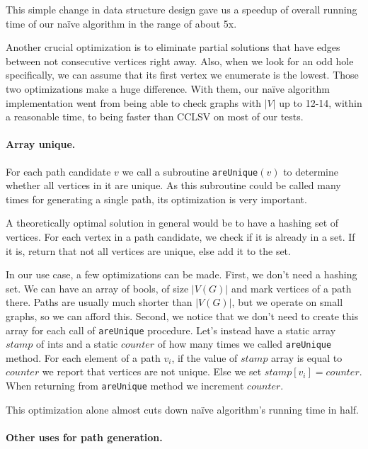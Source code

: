 This simple change in data structure design gave us a speedup of overall running time of our na\"ive algorithm in the range of about 5x.

Another crucial optimization is to eliminate partial solutions that have edges between not consecutive vertices right away. Also, when we look for an odd hole specifically, we can assume that its first vertex we enumerate is the lowest. Those two optimizations make a huge difference. With them, our na\"ive algorithm implementation went from being able to check graphs with $|V|$ up to 12-14, within a reasonable time, to being faster than CCLSV on most of our tests.

\paragraph{Array unique.}

For each path candidate $v$ we call a subroutine \texttt{areUnique}$(v)$ to determine whether all vertices in it are unique. As this subroutine could be called many times for generating a single path, its optimization is very important.

A theoretically optimal solution in general would be to have a hashing set of vertices. For each vertex in a path candidate, we check if it is already in a set. If it is, return that not all vertices are unique, else add it to the set.

In our use case, a few optimizations can be made. First, we don't need a hashing set. We can have an array of bools, of size $|V(G)|$ and mark vertices of a path there. Paths are usually much shorter than $|V(G)|$, but we operate on small graphs, so we can afford this. Second, we notice that we don't need to create this array for each call of \texttt{areUnique} procedure. Let's instead have a static array $stamp$ of ints and a static $counter$ of how many times we called \texttt{areUnique} method. For each element of a path $v_i$, if the value of $stamp$ array is equal to $counter$ we report that vertices are not unique. Else we set $stamp[v_i] = counter$. When returning from \texttt{areUnique} method we increment $counter$.

This optimization alone almost cuts down na\"ive algorithm's running time in half.

\paragraph{Other uses for path generation.}
\label{sec:usesGeneration}


